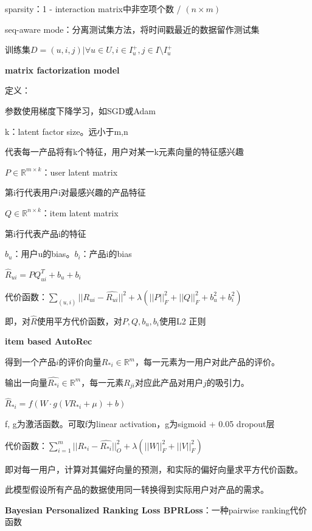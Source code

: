 \documentclass[UTF8]{ctexart}
\begin{document}
  \quad sparsity：1 - interaction matrix中非空项个数 / $(n \times m)$

  \quad seq-aware mode：分离测试集方法，将时间戳最近的数据留作测试集

  \quad 训练集$D = {(u, i, j) | \forall u \in U, i \in I_u^+, j \in I \setminus I_u^+}$


  \textbf{matrix factorization model}

  \quad 定义：

  \quad \quad 参数使用梯度下降学习，如SGD或Adam

  \quad \quad k：latent factor size。远小于m,n

  \quad \quad \quad 代表每一产品将有k个特征，用户对某一k元素向量的特征感兴趣

  \quad \quad $P \in \mathbb{R}^{m \times k}$：user latent matrix

  \quad \quad \quad 第i行代表用户i对最感兴趣的产品特征

  \quad \quad $Q \in \mathbb{R}^{n \times k}$：item latent matrix

  \quad \quad \quad 第i行代表产品i的特征

  \quad \quad $b_u$：用户u的bias。$b_i$：产品i的bias

  \quad \quad $\hat{R}_{ui} = PQ^T_{ui} + b_u + b_i$

  \quad 代价函数：$\sum_{(u, i)} ||R_{ui} - \hat{R_{ui}}||^2 + \lambda(||P||_F^2 + ||Q||_F^2 + b_u^2 + b_i^2)$

  \quad \quad 即，对$\hat{R}$使用平方代价函数，对$P, Q, b_u, b_i$使用L2 正则 

  \textbf{item based AutoRec}

  \quad 得到一个产品$i$的评价向量$R_{*i} \in \mathbb{R}^m$，每一元素为一用户对此产品的评价。
  
  \quad 输出一向量$\hat{R_{*i}} \in \mathbb{R}^m$，每一元素$R_{ji}$对应此产品对用户$j$的吸引力。

  \quad $\hat{R}_{*i} = f(W \cdot g(VR_{*i} + \mu) + b)$

  \quad \quad f, g为激活函数。可取f为linear activation，g为sigmoid + 0.05 dropout层

  \quad 代价函数：$\sum_{i=1}^{m}||R_{*i} - \hat{R_{*i}}||_O^2 + \lambda (||W||_F^2 + ||V||_F^2)$

  \quad \quad 即对每一用户，计算对其偏好向量的预测，和实际的偏好向量求平方代价函数。

  \quad \quad 此模型假设所有产品的数据使用同一转换得到实际用户对产品的需求。

  \textbf{Bayesian Personalized Ranking Loss BPRLoss}：一种pairwise ranking代价函数
\end{document}
